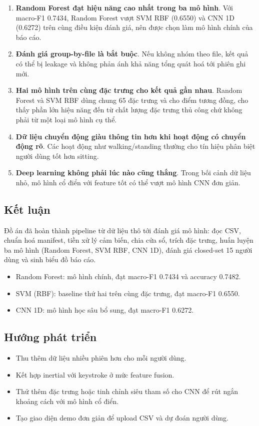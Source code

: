 \documentclass[12pt,a4paper]{article}
\begin{document}
\begin{enumerate}
    \item \textbf{Random Forest đạt hiệu năng cao nhất trong ba mô hình}. Với macro-F1 0.7434, Random Forest vượt SVM RBF (0.6550) và CNN 1D (0.6272) trên cùng điều kiện đánh giá, nên được chọn làm mô hình chính của báo cáo.
    \item \textbf{Đánh giá group-by-file là bắt buộc}. Nếu không nhóm theo file, kết quả có thể bị leakage và không phản ánh khả năng tổng quát hoá tới phiên ghi mới.
    \item \textbf{Hai mô hình trên cùng đặc trưng cho kết quả gần nhau}. Random Forest và SVM RBF dùng chung 65 đặc trưng và cho điểm tương đồng, cho thấy phần lớn hiệu năng đến từ chất lượng đặc trưng thủ công chứ không phải từ một loại mô hình cụ thể.
    \item \textbf{Dữ liệu chuyển động giàu thông tin hơn khi hoạt động có chuyển động rõ}. Các hoạt động như walking/standing thường cho tín hiệu phân biệt người dùng tốt hơn sitting.
    \item \textbf{Deep learning không phải lúc nào cũng thắng}. Trong bối cảnh dữ liệu nhỏ, mô hình cổ điển với feature tốt có thể vượt mô hình CNN đơn giản.
\end{enumerate}

\subsection{Kết luận}

Đồ án đã hoàn thành pipeline từ dữ liệu thô tới đánh giá mô hình: đọc CSV, chuẩn hoá manifest, tiền xử lý cảm biến, chia cửa sổ, trích đặc trưng, huấn luyện ba mô hình (Random Forest, SVM RBF, CNN 1D), đánh giá closed-set 15 người dùng và sinh biểu đồ báo cáo.

\begin{itemize}
    \item Random Forest: mô hình chính, đạt macro-F1 0.7434 và accuracy 0.7482.
    \item SVM (RBF): baseline thứ hai trên cùng đặc trưng, đạt macro-F1 0.6550.
    \item CNN 1D: mô hình học sâu bổ sung, đạt macro-F1 0.6272.
\end{itemize}

\subsection{Hướng phát triển}

\begin{itemize}
    \item Thu thêm dữ liệu nhiều phiên hơn cho mỗi người dùng.
    \item Kết hợp inertial với keystroke ở mức feature fusion.
    \item Thử thêm đặc trưng hoặc tinh chỉnh siêu tham số cho CNN để rút ngắn khoảng cách với mô hình cổ điển.
    \item Tạo giao diện demo đơn giản để upload CSV và dự đoán người dùng.
\end{itemize}
\end{document}
